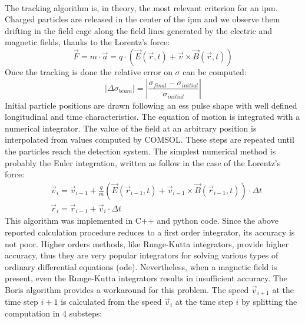 \begin{refsection}
  \paragraph{}
  The tracking algorithm is, in theory, the most relevant criterion for an \acrshort{ipm}. Charged particles are released in the center of the \acrshort{ipm} and we observe them drifting in the field cage along the field lines generated by the electric and magnetic fields, thanks to the Lorentz’s force:
  \begin{equation}
    \vec{F} = m \cdot \vec{a} = q \cdot (\vec{E}(\vec{r},t) + \vec{v} \times \vec{B}(\vec{r},t))
  \end{equation}
  Once the tracking is done the relative error on $\sigma$ can be computed:
  \begin{equation}
    \left| \Delta \sigma_{beam} \right| = \left|\frac{\sigma_{final} - \sigma_{initial}}{\sigma_{initial}} \right|
  \end{equation}
  Initial particle positions are drawn following an \acrshort{ess} pulse shape with well defined longitudinal and time characteristics. The equation of motion is integrated with a numerical integrator. The value of the field at an arbitrary position is interpolated from values computed by COMSOL. These steps are repeated until the particles reach the detection system. The simplest numerical method is probably the Euler integration, written as follow in the case of the Lorentz’s force:
  \begin{align}
     & \vec{v}_{i} = \vec{v}_{i-1} + \frac{q}{m}(\vec{E}(\vec{r}_{i-1},t) + \vec{v}_{i-1} \times \vec{B}(\vec{r}_{i-1},t)) \cdot \Delta t \\
     & \vec{r}_{i} = \vec{r}_{i-1} + \vec{v}_{i} \cdot \Delta t
  \end{align}
  This algorithm was implemented in C++ and python code. Since the above reported calculation procedure reduces to a first order integrator, its accuracy is not poor. Higher orders methods, like Runge-Kutta integrators, provide higher accuracy, thus they are very popular integrators for solving various types of ordinary differential equations (\acrshort{ode}). Nevertheless, when a magnetic field is present, even the Runge-Kutta integrators results in insufficient accuracy.
  The Boris algorithm \cite{Boris1970} provides a workaround for this problem. The speed $\vec{v}_{i+1}$ at the time step $i+1$ is calculated from the speed $\vec{v}_{i}$ at the time step $i$ by splitting the computation in 4 substeps:
  \begin{align}

\end{align}
\end{refsection}
